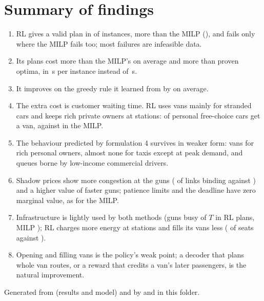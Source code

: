 \section{Summary of findings}
\begin{enumerate}
  \item RL gives a valid plan in \NValid{} of \NInst{} instances, more than the MILP (\NValidM), and fails only where the MILP fails too; most failures are infeasible data.
  \item Its plans cost \GapMean\pct{} more than the MILP's on average and \GapOpt\pct{} more than proven optima, in \RLtime\,s per instance instead of \MILPtime\,s.
  \item It improves on the greedy rule it learned from by \GreedyGapAbs\pct{} on average.
  \item The extra cost is customer waiting time. RL uses vans mainly for stranded cars and keeps rich private owners at stations: \VanRPers\pct{} of personal free-choice cars get a van, against \VanMPers\pct{} in the MILP.
  \item The behaviour predicted by formulation 4 survives in weaker form: vans for rich personal owners, almost none for taxis except at peak demand, and queues borne by low-income commercial drivers.
  \item Shadow prices show more congestion at the guns (\GunBindR\pct{} of links binding against \GunBindM\pct) and a higher value of faster guns; patience limits and the deadline have zero marginal value, as for the MILP.
  \item Infrastructure is lightly used by both methods (guns busy \UtilGunR\pct{} of $T$ in RL plans, MILP \UtilGunM\pct); RL charges more energy at stations and fills its vans less (\UtilSeatR\pct{} of seats against \UtilSeatM\pct).
  \item Opening and filling vans is the policy's weak point; a decoder that plans whole van routes, or a reward that credits a van's later passengers, is the natural improvement.
\end{enumerate}

{\footnotesize Generated from  (results and model) and  by  and  in this folder.}


